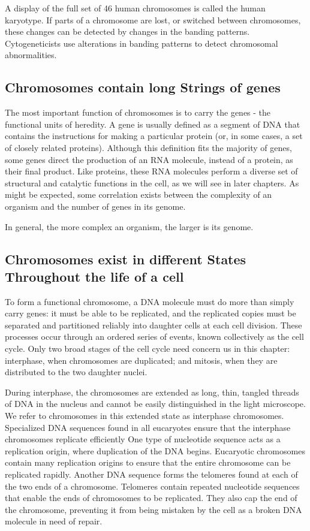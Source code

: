 A display of the full set of 46 human chromosomes is called the human
karyotype. If parts of a chromosome are lost, or switched between chromosomes,
these changes can be detected by changes in the banding
patterns. Cytogeneticists use alterations in banding patterns to detect
chromosomal abnormalities.

\subsection{Chromosomes contain long Strings of genes}

The most important function of chromosomes is to carry the genes - the
functional units of heredity. A gene is usually defined as a
segment of DNA that contains the instructions for making a particular
protein (or, in some cases, a set of closely related proteins). Although
this definition fits the majority of genes, some genes direct the production
of an RNA molecule, instead of a protein, as their final product. Like
proteins, these RNA molecules perform a diverse set of structural and
catalytic functions in the cell, as we will see in later chapters.
As might be expected, some correlation exists between the complexity
of an organism and the number of genes in its genome.

In general, the more complex an organism, the larger is its genome.

\subsection{Chromosomes exist in different States Throughout the life of a cell}

To form a functional chromosome, a DNA molecule must do more than
simply carry genes: it must be able to be replicated, and the replicated
copies must be separated and partitioned reliably into daughter cells at
each cell division. These processes occur through an ordered series of
events, known collectively as the cell cycle.
Only two broad stages of the cell cycle need concern
us in this chapter: interphase, when chromosomes are duplicated; and
mitosis, when they are distributed to the two daughter nuclei.

During interphase, the chromosomes are extended as long, thin, tangled
threads of DNA in the nucleus and cannot be easily distinguished
in the light microscope. We refer to chromosomes in this extended state
as interphase chromosomes. Specialized DNA sequences found in all
eucaryotes ensure that the interphase chromosomes replicate efficiently
One type of nucleotide sequence acts as a replication origin, where duplication of the DNA begins.
Eucaryotic chromosomes contain many replication origins to ensure that
the entire chromosome can be replicated rapidly. Another DNA sequence
forms the telomeres found at each of the two ends of a chromosome.
Telomeres contain repeated nucleotide sequences that enable the ends
of chromosomes to be replicated. They also
cap the end of the chromosome, preventing it from being mistaken by the
cell as a broken DNA molecule in need of repair.

